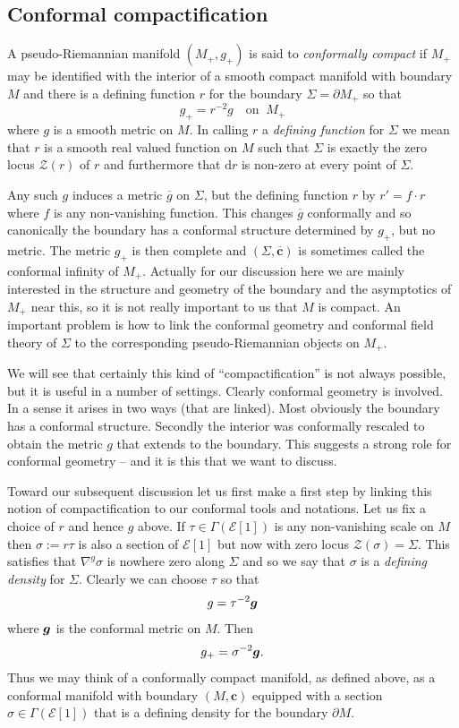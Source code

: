 \documentclass[a4paper,12pt]{amsart}
\def\g{g_+}
\def\M{M_+}
\newcommand{\cZ}{\mathcal{Z}}
\newcommand{\og}{\overline{g}}
\newcommand{\occ}{\overline{\cc}}
\def\Cal{\mathcal}
\newcommand{\cc}{\boldsymbol{c}}
\newcommand{\ce}{{\Cal E}}
\def\bg{\mbox{\boldmath $g$}}
\newcommand{\si}{\sigma}
\theoremstyle{remark}
\begin{document}
\subsection{Conformal compactification}

A pseudo-Riemannian manifold $(\M,\g)$ is said to {\em conformally compact} if $\M$ may be identified with the interior of a
smooth compact manifold with boundary $M$ and there is a defining
function $r$ for the boundary $\Sigma =\partial \M$ so that
$$
\g=r^{-2}g  \quad \mbox{on }~ \M
$$ where $g$ is a smooth metric on $M$. In calling $r$  a  {\em defining function} for $\Sigma$ we mean that $r$ is a smooth real valued function on $M$ such that $\Sigma$ is exactly the zero locus $\cZ(r)$ of $r$ and furthermore that  $\mathrm{d} r$ is non-zero at every point of $\Sigma$.   


Any such $g$ induces a metric $\og$ on $\Sigma$, but the
defining function $r$ by $r'=f\cdot r$ where $f$ is any non-vanishing
function. This changes $\og$ conformally and so canonically the
boundary has a conformal structure determined by $\g$, but no
metric. The metric $\g$ is then complete and $(\Sigma,\occ)$ is
sometimes called the conformal infinity of $\M$. Actually for our
discussion here we are mainly interested in the structure and geometry
of the boundary and the asymptotics of $\M$ near this, so it is not
really important to us that $M$ is compact. An important problem is
how to link the conformal geometry and conformal field theory of
$\Sigma$ to the corresponding pseudo-Riemannian objects on $\M$.

We will see that certainly this kind of ``compactification'' is not
always possible, but it is useful in a number of settings. Clearly
conformal geometry is involved. In a sense it arises in two ways
(that are linked). Most obviously the boundary has a conformal
structure. Secondly the interior was conformally rescaled to obtain
the metric $g$ that extends to the boundary. This suggests a strong
role for conformal geometry -- and it is this that we want to discuss.
 
Toward our subsequent discussion let us first make a first step by
linking this notion of compactification to our conformal tools and notations. Let us fix a choice of $r$ and hence $g$ above. 
If $\tau\in \Gamma (\ce[1])$ is any non-vanishing scale on $M$ then $\si:=r\tau$ is also a section of $\ce[1]$ but now with zero locus
$\cZ(\si)=\Sigma$. This satisfies that $\nabla^{g}\si $ is nowhere
zero along $\Sigma$ and so we say that $\si$ is a {\em defining density} for $\Sigma$. Clearly we can choose $\tau$ so that 
$$
g = \tau^{-2}\bg
$$
where $\bg$ is the conformal metric on $M$. Then 
$$
\g = \si^{-2}\bg .
$$
Thus we may think of a conformally compact manifold, as defined above, as a conformal manifold with boundary $(M,\cc)$ equipped with a section $\si\in \Gamma
(\ce[1])$ that is a defining density for the boundary $\partial M$. 
  
\end{document}
